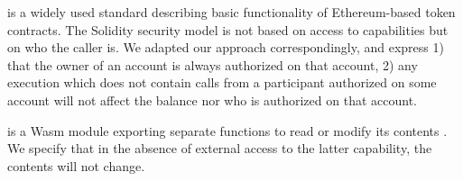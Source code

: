   is a widely used %
 standard describing  basic functionality of Ethereum-based token 
contracts. 
The Solidity security model is not based on access to  capabilities but on who the caller  is. 
We  adapted our approach correspondingly, and 
express 1) that  the owner of an account is always authorized on that account,  2) any execution which does not contain calls from a participant  authorized on some account will not affect the balance nor  who is authorized on  that account. 

 is a Wasm module exporting separate functions to read or modify its contents \cite{irisWasm23}. We specify that in the absence of external access to the latter capability, the contents will not change.  